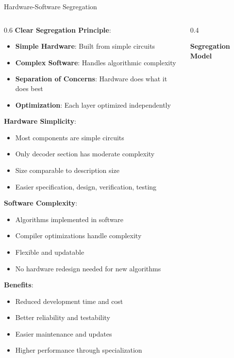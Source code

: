 \documentclass[aspectratio=169]{beamer}
\newcommand{\concept}[1]{\textbf{\color{darkblue}#1}}
\begin{document}
\begin{frame}{Hardware-Software Segregation}
\begin{columns}
\begin{column}{0.6\textwidth}
\concept{Clear Segregation Principle}:
\begin{itemize}
\item \textbf{Simple Hardware}: Built from simple circuits
\item \textbf{Complex Software}: Handles algorithmic complexity
\item \textbf{Separation of Concerns}: Hardware does what it does best
\item \textbf{Optimization}: Each layer optimized independently
\end{itemize}

\vspace{0.3cm}
\concept{Hardware Simplicity}:
\begin{itemize}
\item Most components are simple circuits
\item Only decoder section has moderate complexity
\item Size comparable to description size
\item Easier specification, design, verification, testing
\end{itemize}

\vspace{0.3cm}
\concept{Software Complexity}:
\begin{itemize}
\item Algorithms implemented in software
\item Compiler optimizations handle complexity
\item Flexible and updatable
\item No hardware redesign needed for new algorithms
\end{itemize}

\vspace{0.3cm}
\concept{Benefits}:
\begin{itemize}
\item Reduced development time and cost
\item Better reliability and testability
\item Easier maintenance and updates
\item Higher performance through specialization
\end{itemize}
\end{column}
\begin{column}{0.4\textwidth}
\begin{center}
\textbf{Segregation Model}
\vspace{0.3cm}


\end{center}
\end{column}
\end{columns}
\end{frame}
\end{document}
